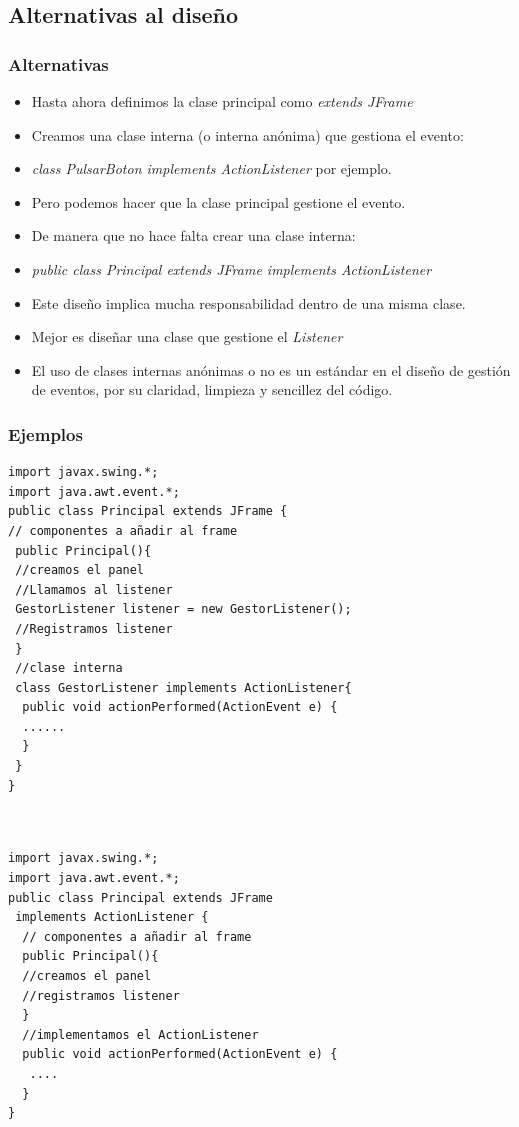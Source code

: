 \documentclass{beamer}
\begin{document}
\subsection{Alternativas al diseño}
\begin{frame}[fragile]
    \frametitle{Alternativas}
  \begin{itemize}[<+->]
  \item Hasta ahora definimos la clase principal como \emph{extends JFrame}
  \item Creamos una clase interna (o interna anónima) que gestiona el evento:
  \item \emph{class PulsarBoton implements ActionListener} por ejemplo.
  \item Pero podemos hacer que la clase principal gestione el evento.
  \item De manera que no hace falta crear una clase interna:
  \item \emph{public class Principal extends JFrame implements ActionListener}
  \item Este diseño implica mucha responsabilidad dentro de una misma clase.
  \item Mejor es diseñar una clase que gestione el \emph{Listener}
  \item El uso de clases internas anónimas o no es un estándar en el diseño de gestión de eventos, por su claridad, limpieza y sencillez del código.
  \end{itemize}
  
\end{frame}

\begin{frame}[fragile]
\frametitle{Ejemplos}
\begin{multicols}{2}
\begin{tiny}
\begin{verbatim}
import javax.swing.*;
import java.awt.event.*;
public class Principal extends JFrame {
// componentes a añadir al frame
 public Principal(){
 //creamos el panel
 //Llamamos al listener
 GestorListener listener = new GestorListener();
 //Registramos listener
 }
 //clase interna
 class GestorListener implements ActionListener{
  public void actionPerformed(ActionEvent e) {
  ......
  }
 }
}
\end{verbatim}
\begin{verbatim}


import javax.swing.*;
import java.awt.event.*;
public class Principal extends JFrame 
 implements ActionListener {
  // componentes a añadir al frame
  public Principal(){
  //creamos el panel
  //registramos listener
  }
  //implementamos el ActionListener
  public void actionPerformed(ActionEvent e) {
   ....
  }
}  
\end{verbatim}
\end{tiny}
\end{multicols}
\end{frame}
\end{document}
